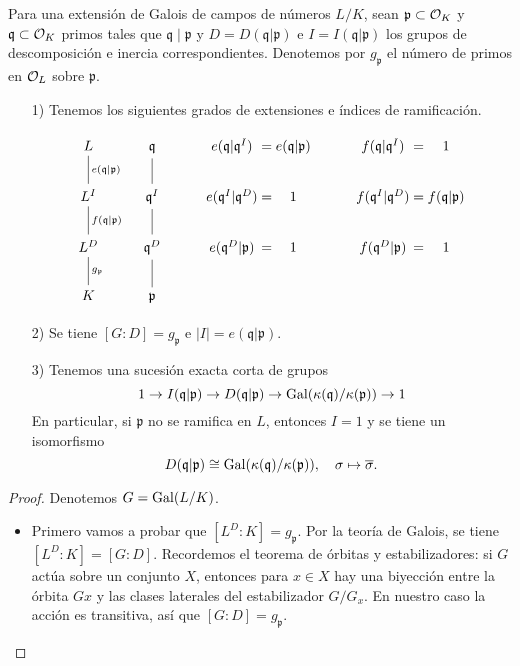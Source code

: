 \begin{teorema}
  Para una extensión de Galois de campos de números $L/K$, sean
  $\mathfrak{p} \subset \mathcal{O}_K$ y $\mathfrak{q} \subset \mathcal{O}_K$ primos tales que
  $\mathfrak{q}\mid\mathfrak{p}$ y $D = D (\mathfrak{q}|\mathfrak{p})$
  e $I = I (\mathfrak{q}|\mathfrak{p})$ los grupos de descomposición
  e inercia correspondientes. Denotemos por $g_\mathfrak{p}$ el número de primos
  en $\mathcal{O}_L$ sobre $\mathfrak{p}$.

  \begin{enumerate}
  \item[1)] Tenemos los siguientes grados de extensiones e índices de
    ramificación.

    \[ \begin{tikzcd}
      L \ar[-]{d}{e (\mathfrak{q}|\mathfrak{p})} & \mathfrak{q} \ar[-]{d} & e (\mathfrak{q}|\mathfrak{q}^I) &[-3em] = &[-3em] e (\mathfrak{q}|\mathfrak{p}) & f (\mathfrak{q}|\mathfrak{q}^I) &[-3em] = &[-3em] 1 \\
      L^I \ar[-]{d}{f (\mathfrak{q}|\mathfrak{p})} & \mathfrak{q}^I \ar[-]{d} & e (\mathfrak{q}^I|\mathfrak{q}^D) & = & 1 & f (\mathfrak{q}^I|\mathfrak{q}^D) & = & f (\mathfrak{q}|\mathfrak{p}) \\
      L^D \ar[-]{d}{g_\mathfrak{p}} & \mathfrak{q}^D \ar[-]{d} & e (\mathfrak{q}^D|\mathfrak{p}) & = & 1 & f (\mathfrak{q}^D|\mathfrak{p}) & = & 1 \\
      K & \mathfrak{p}
    \end{tikzcd} \]

  \item[2)] Se tiene $[G : D] = g_\mathfrak{p}$ e
    $|I| = e (\mathfrak{q}|\mathfrak{p})$.

  \item[3)] Tenemos una sucesión exacta corta de grupos
    \[ 1 \to I (\mathfrak{q}|\mathfrak{p}) \to
    D (\mathfrak{q}|\mathfrak{p}) \to
    \operatorname{Gal} (\kappa(\mathfrak{q})/\kappa(\mathfrak{p})) \to 1 \]
    En particular, si $\mathfrak{p}$ no se ramifica en $L$, entonces $I = 1$
    y se tiene un isomorfismo
    \[ D (\mathfrak{q}|\mathfrak{p}) \cong
    \operatorname{Gal} (\kappa(\mathfrak{q})/\kappa(\mathfrak{p})), \quad
    \sigma \mapsto \overline{\sigma}. \]
  \end{enumerate}

  \begin{proof}
    Denotemos $G = \operatorname{Gal} (L/K)$.

    \begin{itemize}
      \item Primero vamos a probar que $[L^D : K] = g_\mathfrak{p}$. Por la
        teoría de Galois, se tiene $[L^D : K] = [G : D]$. Recordemos el
        teorema de órbitas y estabilizadores: si $G$ actúa sobre un conjunto
        $X$, entonces para $x \in X$ hay una biyección entre la órbita $Gx$ y
        las clases laterales del estabilizador $G/G_x$. En nuestro caso la
        acción es transitiva, así que $[G : D] = g_\mathfrak{p}$.


\end{itemize}
\end{proof}
\end{teorema}
